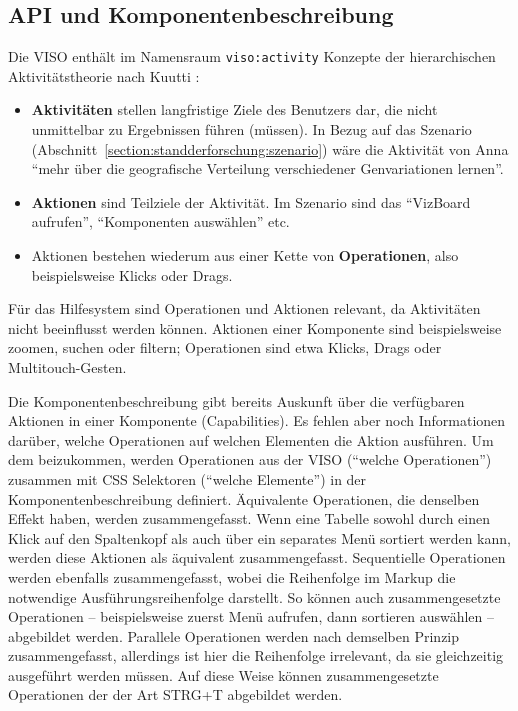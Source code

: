 \documentclass[
	headsepline,
	footsepline,
	fontsize=12pt,
	bibliography=totoc
]{scrbook}
\begin{document}

\subsection{API und Komponentenbeschreibung}
\label{section:konzeption:bedienung:api}


Die VISO enthält im Namensraum \texttt{viso:activity} Konzepte der hierarchischen Aktivitätstheorie nach Kuutti \cite{Kuutti1996}:

\begin{itemize}
	\item \textbf{Aktivitäten} stellen langfristige Ziele des Benutzers dar, die nicht unmittelbar zu Ergebnissen führen (müssen). In Bezug auf das Szenario (Abschnitt~\ref{section:standderforschung:szenario}) wäre die Aktivität von Anna \enquote{mehr über die geografische Verteilung verschiedener Genvariationen lernen}.
	\item \textbf{Aktionen} sind Teilziele der Aktivität. Im Szenario sind das \enquote{VizBoard aufrufen}, \enquote{Komponenten auswählen} etc.
	\item Aktionen bestehen wiederum aus einer Kette von \textbf{Operationen}, also beispielsweise Klicks oder Drags.
\end{itemize}

Für das Hilfesystem sind Operationen und Aktionen relevant, da Aktivitäten nicht beeinflusst werden können. Aktionen einer Komponente sind beispielsweise zoomen, suchen oder filtern; Operationen sind etwa Klicks, Drags oder Multitouch-Gesten.

Die Komponentenbeschreibung gibt bereits Auskunft über die verfügbaren Aktionen in einer Komponente (Capabilities). Es fehlen aber noch Informationen darüber, welche Operationen auf welchen Elementen die Aktion ausführen. Um dem beizukommen, werden Operationen aus der VISO (\enquote{welche Operationen}) zusammen mit CSS Selektoren (\enquote{welche Elemente}) in der Komponentenbeschreibung definiert. Äquivalente Operationen, die denselben Effekt haben, werden zusammengefasst. Wenn eine Tabelle sowohl durch einen Klick auf den Spaltenkopf als auch über ein separates Menü sortiert werden kann, werden diese Aktionen als äquivalent zusammengefasst. Sequentielle Operationen werden ebenfalls zusammengefasst, wobei die Reihenfolge im Markup die notwendige Ausführungsreihenfolge darstellt. So können auch zusammengesetzte Operationen -- beispielsweise zuerst Menü aufrufen, dann sortieren auswählen -- abgebildet werden. Parallele Operationen werden nach demselben Prinzip zusammengefasst, allerdings ist hier die Reihenfolge irrelevant, da sie gleichzeitig ausgeführt werden müssen. Auf diese Weise können zusammengesetzte Operationen der der Art STRG+T abgebildet werden.
\end{document}
